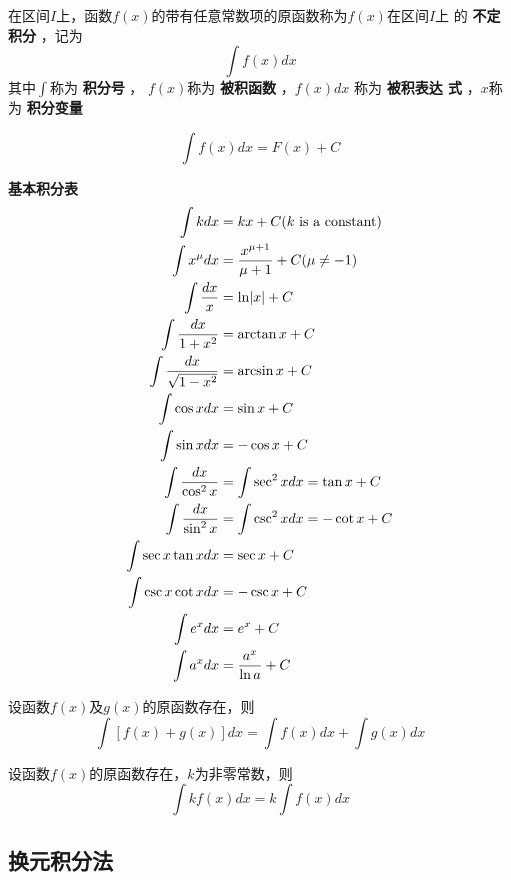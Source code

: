 \documentclass[11pt]{article}
\begin{document}
\begin{definition}[]
在区间\(I\)上，函数\(f(x)\)的带有任意常数项的原函数称为\(f(x)\)在区间\(I\)上
的 \textbf{不定积分} ，记为
\begin{equation*}
\int f(x)dx
\end{equation*}
其中\(\int\)称为 \textbf{积分号} ， \(f(x)\)称为 \textbf{被积函数} ，\(f(x)dx\) 称为 \textbf{被积表达
式} ，\(x\)称为 \textbf{积分变量}
\end{definition}

\begin{equation*}
\int f(x)dx=F(x)+C
\end{equation*}

\textbf{基本积分表}
\begin{align*}
\int kdx&=kx+C(k\text{ is a constant})\\
\int x^\mu dx&=\frac{x^{\mu+1}}{\mu+1}+C(\mu\neq-1)\\
\int \frac{dx}{x}&=\ln\abs{x}+C\\
\int\frac{dx}{1+x^2}&=\arctan x+C\\
\int\frac{dx}{\sqrt{1-x^2}}&=\arcsin x+C\\
\int\cos xdx&=\sin x+C\\
\int \sin xdx&=-\cos x+C\\
\int\frac{dx}{\cos^2x}&=\int\sec^2xdx=\tan x+C\\
\int\frac{dx}{\sin^2x}&=\int\csc^2xdx=-\cot x+C\\
\int\sec x\tan xdx&=\sec x+C\\
\int\csc x\cot xdx&=-\csc x+C\\
\int e^xdx&=e^x+C\\
\int a^xdx&=\frac{a^x}{\ln a}+C\\
\end{align*}

\begin{proposition}[]
设函数\(f(x)\)及\(g(x)\)的原函数存在，则
\begin{equation*}
\int[f(x)+g(x)]dx=\int f(x)dx+\int g(x)dx
\end{equation*}
\end{proposition}

\begin{proposition}[]
设函数\(f(x)\)的原函数存在，\(k\)为非零常数，则
\begin{equation*}
\int kf(x)dx=k\int f(x)dx
\end{equation*}
\end{proposition}
\subsection{换元积分法}
\label{sec:org3135c1f}
\end{document}
